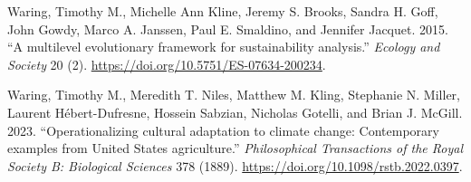 \documentclass[
]{article}
\newlength{\cslhangindent}
\newenvironment{CSLReferences}[2] %
 {\begin{list}{}{%
  \setlength{\itemindent}{0pt}
  \setlength{\leftmargin}{0pt}
  \setlength{\parsep}{0pt}
  \ifodd #1
   \setlength{\leftmargin}{\cslhangindent}
   \setlength{\itemindent}{-1\cslhangindent}
  \fi
  \setlength{\itemsep}{#2\baselineskip}}}
 {\end{list}}
\begin{document}
\begin{CSLReferences}{1}{0}
Waring, Timothy M., Michelle Ann Kline, Jeremy S. Brooks, Sandra H.
Goff, John Gowdy, Marco A. Janssen, Paul E. Smaldino, and Jennifer
Jacquet. 2015. {``{A multilevel evolutionary framework for
sustainability analysis}.''} \emph{Ecology and Society} 20 (2).
\url{https://doi.org/10.5751/ES-07634-200234}.

Waring, Timothy M., Meredith T. Niles, Matthew M. Kling, Stephanie N.
Miller, Laurent Hébert-Dufresne, Hossein Sabzian, Nicholas Gotelli, and
Brian J. McGill. 2023. {``{Operationalizing cultural adaptation to
climate change: Contemporary examples from United States
agriculture}.''} \emph{Philosophical Transactions of the Royal Society
B: Biological Sciences} 378 (1889).
\url{https://doi.org/10.1098/rstb.2022.0397}.

\end{CSLReferences}
\end{document}
